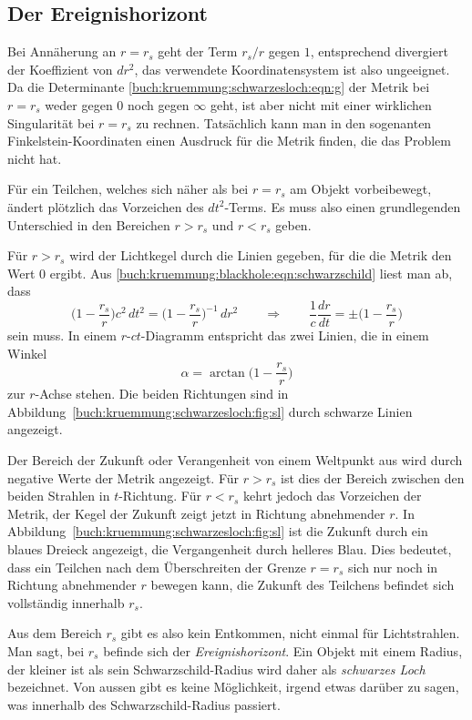 \subsection{Der Ereignishorizont}
Bei Annäherung an $r=r_s$ geht der Term $r_s/r$ gegen $1$, entsprechend
divergiert der Koeffizient von $dr^2$,
das verwendete Koordinatensystem ist also ungeeignet.
Da die Determinante \eqref{buch:kruemmung:schwarzesloch:eqn:g}
der Metrik bei $r=r_s$ weder gegen $0$ noch
gegen $\infty$ geht, ist aber nicht mit einer wirklichen
Singularität bei $r=r_s$ zu rechnen.
Tatsächlich kann man in den sogenanten Finkelstein-Koordinaten
einen Ausdruck für die Metrik finden, die das Problem nicht hat.

Für ein Teilchen, welches sich näher als bei $r=r_s$ am Objekt
vorbeibewegt, ändert plötzlich das Vorzeichen des $dt^2$-Terms.
Es muss also einen grundlegenden Unterschied in den Bereichen
$r>r_s$ und $r<r_s$ geben.

Für $r>r_s$ wird der Lichtkegel durch die Linien gegeben, für
die die Metrik den Wert 0 ergibt.
%
Aus \eqref{buch:kruemmung:blackhole:eqn:schwarzschild} liest man
ab, dass 
\[
\biggl(1-\frac{r_s}{r}\biggr) c^2\, dt^2
=
\biggl(1-\frac{r_s}{r}\biggr)^{-1}\,dr^2
\qquad\Rightarrow\qquad
\frac1c\frac{dr}{dt}
=
\pm
\biggl(1-\frac{r_s}{r}\biggr)
\]
sein muss.
%
In einem $r$-$ct$-Diagramm entspricht das zwei Linien, die
in einem Winkel 
\[
\alpha = \arctan \biggl(1-\frac{r_s}{r}\biggr)
\]
zur $r$-Achse stehen.
Die beiden Richtungen sind in
Abbildung~\ref{buch:kruemmung:schwarzesloch:fig:sl}
durch schwarze Linien angezeigt.

Der Bereich der Zukunft oder Verangenheit von einem Weltpunkt aus
wird durch negative Werte der Metrik angezeigt.
Für $r>r_s$ ist dies der Bereich zwischen den beiden Strahlen in
$t$-Richtung.
Für $r<r_s$ kehrt jedoch das Vorzeichen der Metrik, der Kegel der
Zukunft zeigt jetzt in Richtung abnehmender $r$.
In Abbildung~\ref{buch:kruemmung:schwarzesloch:fig:sl} ist die
Zukunft durch ein blaues Dreieck angezeigt, die Vergangenheit durch
helleres Blau.
Dies bedeutet, dass ein Teilchen nach dem Überschreiten der Grenze $r=r_s$
sich nur noch in Richtung abnehmender $r$ bewegen kann, die Zukunft des
Teilchens befindet sich vollständig innerhalb $r_s$.

Aus dem Bereich $r_s$ gibt es also kein Entkommen, nicht einmal
für Lichtstrahlen.
Man sagt, bei $r_s$ befinde sich der \emph{Ereignishorizont}.
%
Ein Objekt mit einem Radius, der kleiner ist als sein Schwarzschild-Radius
wird daher als \emph{schwarzes Loch} bezeichnet.
%
Von aussen gibt es keine Möglichkeit, irgend etwas darüber zu sagen,
was innerhalb des Schwarzschild-Radius passiert.


